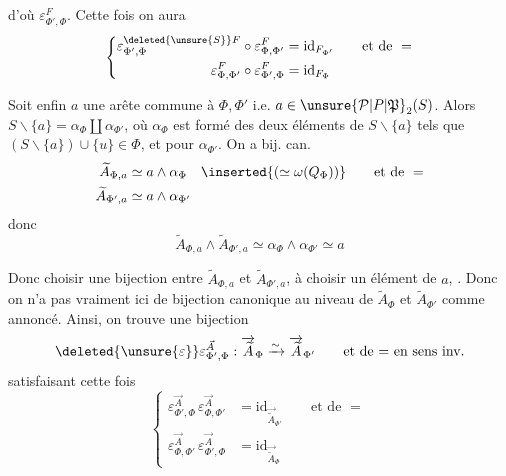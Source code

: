 d'où $\varepsilon^F_{\Phi',\Phi}$. Cette fois on aura
\[
\left\{\begin{aligned}
\varepsilon^{\deleted{\unsure{S}}F}_{\Phi',\Phi}\circ\varepsilon^F_{\Phi,\Phi'}&=\mathrm{id}_{F_{\Phi'}}\qquad\text{et de }=\\
\varepsilon^F_{\Phi,\Phi'}\circ\varepsilon^F_{\Phi',\Phi}&=\mathrm{id}_{F_\Phi}
\end{aligned}\right.
\]

Soit enfin $a$ une arête commune à $\Phi,\Phi'$
i.e. $a\in\unsure{\mathcal P|P|\mathfrak P}_2(S)$. Alors $S\smallsetminus\{a\}=\alpha_\Phi\amalg\alpha_{\Phi'}$, où $\alpha_\Phi$ est
formé des deux éléments  de $S\smallsetminus\{a\}$ tels que
$(S\smallsetminus\{a\})\cup\{u\}\in\Phi$, et  pour $\alpha_{\Phi'}$. On a bij. can.
\[
\begin{aligned}
\widetilde A_{\Phi,a}&\simeq a\wedge\alpha_\Phi\quad\inserted{(\simeq\omega(Q_\Phi))}\qquad\text{et de }=\\
\widetilde A_{\Phi',a}&\simeq a\wedge\alpha_{\Phi'}
\end{aligned}
\]
donc
\[
\widetilde A_{\Phi,a}\wedge\widetilde A_{\Phi',a}\simeq\alpha_\Phi\wedge\alpha_{\Phi'}\simeq a
\]

Donc choisir une bijection entre $\widetilde A_{\Phi,a}$ et $\widetilde A_{\Phi',a}$, 
à choisir un élément de $a$, .
Donc on n'a pas
vraiment ici de bijection canonique au niveau
de $\widetilde A_\Phi$ et $\widetilde A_{\Phi'}$ comme annoncé. Ainsi, on
trouve une bijection
\[
\deleted{\unsure{\varepsilon}}\varepsilon^{\vec A}_{\Phi',\Phi}:
\overrightarrow{\widetilde A}_\Phi\xrightarrow{\sim}\overrightarrow{\widetilde A}_{\Phi'}
\qquad\text{et de $=$ en sens inv.}
\]
satisfaisant cette fois
\[
\left\{\begin{aligned}
\varepsilon^{\vec A}_{\Phi',\Phi}\,\varepsilon^{\vec A}_{\Phi,\Phi'}&=\mathrm{id}_{\overrightarrow{\widetilde A}_{\Phi'}}\qquad\text{et de }=\\
\varepsilon^{\vec A}_{\Phi,\Phi'}\,\varepsilon^{\vec A}_{\Phi',\Phi}&=\mathrm{id}_{\overrightarrow{\widetilde A}_\Phi}
\end{aligned}\right.
\]


